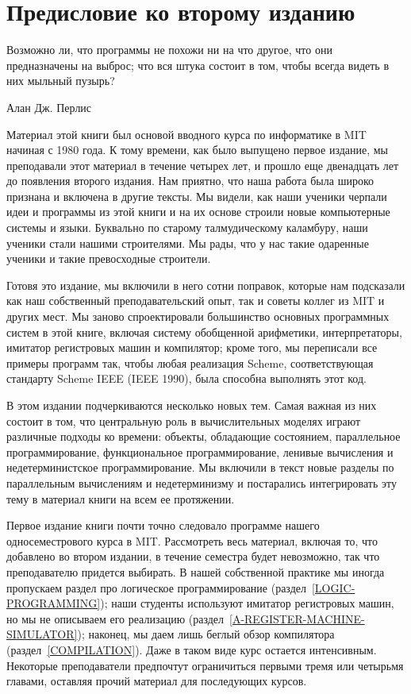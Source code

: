 \chapter*{Предисловие ко второму изданию}
\thispagestyle{empty}

\epigraph{
Возможно ли, что программы не похожи ни на что
другое, что они предназначены на выброс; что вся
штука состоит в том, чтобы всегда видеть в них мыльный
пузырь?}{Алан Дж. Перлис}
Материал этой книги был основой вводного курса по
информатике в MIT начиная с 1980 года.  К тому времени, как было
выпущено первое издание, мы преподавали этот материал в течение четырех
лет, и прошло еще двенадцать лет до появления второго
издания.  Нам приятно, что наша работа была широко признана и включена в
другие тексты.  Мы видели, как наши ученики черпали идеи и программы из
этой книги и на их основе строили новые компьютерные системы и
языки.  Буквально по старому талмудическому каламбуру, наши ученики
стали нашими строителями.  Мы рады, что у нас такие одаренные ученики и
такие превосходные строители.

Готовя это издание, мы включили в него сотни
поправок, которые нам подсказали как наш собственный преподавательский 
опыт, так и советы коллег из MIT и других мест.  Мы заново
спроектировали большинство основных программных систем в этой книге,
включая систему обобщенной арифметики, интерпретаторы, имитатор
регистровых машин и компилятор; кроме того, мы переписали все примеры
программ так, чтобы любая реализация Scheme, соответствующая стандарту
Scheme IEEE (IEEE 1990), была способна выполнять этот код.

В этом издании подчеркиваются несколько новых тем.  Самая
важная из них состоит в том, что центральную роль в вычислительных
моделях играют различные подходы
ко времени: объекты, обладающие состоянием,
параллельное программирование, функциональное программирование,
ленивые вычисления и недетерминистское программирование.  Мы включили
в текст новые разделы по параллельным вычислениям и недетерминизму и
постарались интегрировать эту тему в материал книги на всем ее
протяжении.

Первое издание книги почти точно следовало программе нашего
односеместрового курса в MIT.  Рассмотреть весь материал, включая то,
что добавлено во втором издании, в течение семестра будет невозможно, так что
преподавателю придется выбирать.  В нашей собственной практике мы
иногда пропускаем раздел про логическое программирование 
(раздел~\ref{LOGIC-PROGRAMMING}); наши студенты
используют имитатор регистровых машин, но мы не описываем его
реализацию (раздел~\ref{A-REGISTER-MACHINE-SIMULATOR}); наконец, мы 
даем лишь беглый обзор компилятора (раздел~\ref{COMPILATION}). 
Даже в таком виде курс остается интенсивным. Некоторые преподаватели 
предпочтут ограничиться первыми тремя или четырьмя главами, оставляя
прочий материал для последующих курсов.

